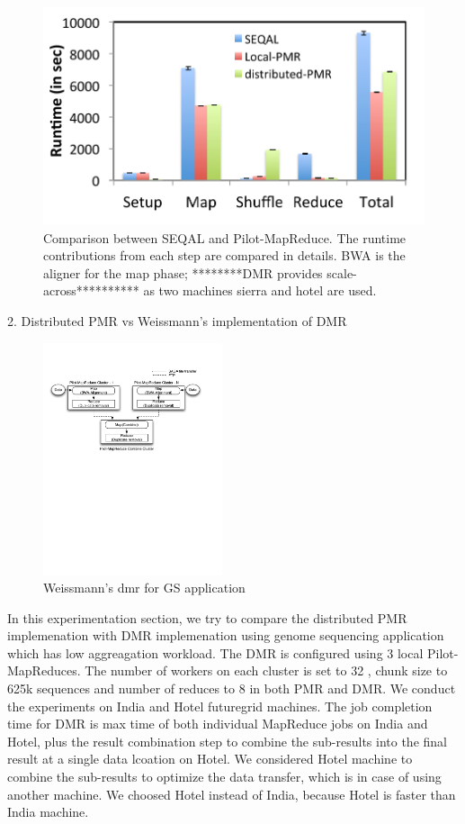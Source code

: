 \documentclass{acm_proc_article-sp}
\begin{document}
\begin{figure} 
 \centering
\includegraphics[scale=0.50]{figures/8GB_phasewisetimes.pdf}
\caption{\small Comparison between SEQAL and Pilot-MapReduce.  The runtime contributions from each step are compared in details. BWA is the aligner for the map phase; ********DMR provides scale-across********** as two machines sierra and hotel are used.}
  \label{fig:comp_with_seqal_2} 
\end{figure}



2. Distributed PMR vs Weissmann's implementation of  DMR

\begin{figure}[jonsdmr]
	\centering
		\includegraphics[width=0.47\textwidth]{figures/jon_dmr_dup_rm_app.pdf}
	\caption{Weissmann's dmr for GS application} 
	\label{fig:figures_jonsdmr}
\end{figure}

In this experimentation section, we try to compare the distributed PMR implemenation with \cite{weissmann} DMR implemenation using genome sequencing application which has low aggreagation workload. The DMR is configured using 3 local Pilot-MapReduces. The number of workers on each cluster is set to 32 , chunk size to 625k sequences and number of reduces to 8 in both PMR and DMR. We conduct the experiments on India and Hotel futuregrid machines. The job completion time for DMR is max time of both individual MapReduce jobs on India and Hotel, plus the result combination step to combine the sub-results into the final result at a single data lcoation on Hotel.  We considered Hotel machine to combine the sub-results to optimize the data transfer, which is in case of using another machine. We choosed Hotel instead of India, because Hotel is faster than India machine.
\end{document}
